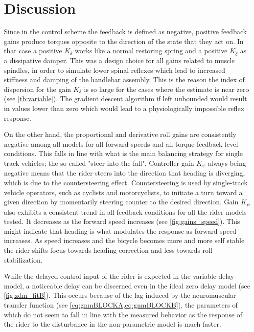 \section{Discussion}
 
Since in the control scheme the feedback is defined as negative, positive feedback gains produce torques opposite to the direction of the state that they act on. In that case a  positive \ensuremath{K_\delta} works like a normal restoring spring and  a positive \ensuremath{K_{\dot{\delta}}} as a dissipative damper. This was a design choice for all gains related to muscle spindles, in order to simulate lower spinal reflexes which  lead to increased stiffness and damping of the handlebar assembly. This is the reason the index of dispersion for the gain \ensuremath{K_\delta} is so large for the cases where the estimate is near zero (see \cref{tb:variable}). The gradient descent algorithm if left unbounded would result in values lower than zero which would lead to a physiologically impossible reflex response.  

On the other hand, the proportional and derivative roll gains  are consistently negative among all models for all forward speeds and all torque feedback level conditions. This falls in line with what is the main balancing strategy for single track vehicles; the so called "steer into the fall". Controller gain \ensuremath{K_\psi} always being negative means that the rider steers into the direction that heading is diverging, which  is due to the countersteering effect. Countersteering is used by single-track vehicle operators, such as cyclists and motorcyclists, to initiate a turn toward a given direction by momentarily steering counter to the desired direction. Gain \ensuremath{K_\psi} also exhibits a  consistent trend in all feedback conditions for all the rider models tested. It decreases as the forward speed increases (see \cref{fig:gains_speed}). This might indicate that heading is what modulates the response as forward speed increases. As  speed increases and the bicycle becomes more and more self stable the rider shifts focus towards heading correction and less towards roll stabilization. 

While the delayed control input  of the rider is expected in the variable delay model, a noticeable delay can be discerned even in the ideal zero delay model (see \cref{fig:zdm_fitB}). This occurs because  of the lag induced by the neuromuscular transfer function (see \cref{eq:gnmBLOCKA,eq:gnmBLOCKB}), the parameters of which do not seem to fall in line with the measured behavior as the response of the rider to the disturbance in the non-parametric model is much faster. 

